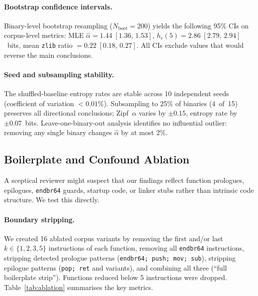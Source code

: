 \documentclass[10pt,twocolumn]{article}
\newcommand{\zlib}{\texttt{zlib}}
\begin{document}
\paragraph{Bootstrap confidence intervals.}
Binary-level bootstrap resampling ($N_{\text{boot}} = 200$) yields the
following 95\% CIs on corpus-level metrics:
MLE $\hat{\alpha} = 1.44\;[1.36,\, 1.53]$,
$h_r(5) = 2.86\;[2.79,\, 2.94]$~bits,
mean \zlib{} ratio $= 0.22\;[0.18,\, 0.27]$.
All CIs exclude values that would reverse the main conclusions.

\paragraph{Seed and subsampling stability.}
The shuffled-baseline entropy rates are stable across 10 independent seeds
(coefficient of variation $< 0.01\%$).  Subsampling to 25\% of binaries
(4~of~15) preserves all directional conclusions; Zipf~$\alpha$ varies by
$\pm 0.15$, entropy rate by $\pm 0.07$~bits.  Leave-one-binary-out analysis
identifies no influential outlier: removing any single binary changes
$\hat{\alpha}$ by at most 2\%.

\subsection{Boilerplate and Confound Ablation}
\label{sec:ablation}

A sceptical reviewer might suspect that our findings reflect function
prologues, epilogues, \texttt{endbr64} guards, startup code, or linker
stubs rather than intrinsic code structure.  We test this directly.

\paragraph{Boundary stripping.}
We created 16 ablated corpus variants by removing the first and/or last
$k \in \{1,2,3,5\}$ instructions of each function, removing all
\texttt{endbr64} instructions, stripping detected prologue patterns
(\texttt{endbr64; push; mov; sub}), stripping epilogue patterns
(\texttt{pop; ret} and variants), and combining all three (``full
boilerplate strip'').  Functions reduced below 5 instructions were dropped.
Table~\ref{tab:ablation} summarises the key metrics.
\end{document}
